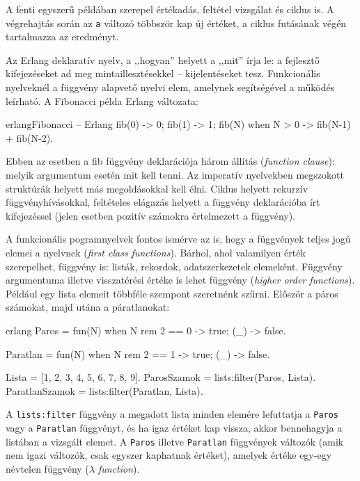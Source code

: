\documentclass[12pt, a4paper, oneside]{book}
\begin{document}
A fenti egyszerű példában szerepel értékadás, feltétel vizsgálat és ciklus is.
A végrehajtás során az \texttt{a} változó többször kap új értéket, a ciklus futásának
végén tartalmazza az eredményt.

Az Erlang deklaratív nyelv, a ,,hogyan'' helyett a ,,mit'' írja le: a fejlesztő
kifejezéseket ad meg mintaillesztésekkel -- kijelentéseket tesz. Funkcionális
nyelveknél a függvény alapvető nyelvi elem, amelynek segítségével a működés
leírható. A Fibonacci példa Erlang változata:

\begin{code}{erlang}{Fibonacci -- Erlang}
fib(0) -> 0; 
fib(1) -> 1; 
fib(N) when N > 0 -> fib(N-1) + fib(N-2).  
\end{code} 

Ebben az esetben a fib függvény deklarációja három állítás
(\emph{function clause}): melyik argumentum esetén mit kell tenni. Az imperatív
nyelvekben megszokott struktúrák helyett más megoldásokkal kell élni. Ciklus
helyett rekurzív függvényhívásokkal, feltételes elágazás helyett a függvény
deklarációba írt kifejezéssel (jelen esetben pozitív számokra értelmezett a
függvény).

A funkcionális pogramnyelvek fontos ismérve az is, hogy a függvények teljes jogú
elemei a nyelvnek (\emph{first class functions}). Bárhol, ahol valamilyen érték
szerepelhet, függvény is: listák, rekordok, adatszerkezetek elemeként. Függvény
argumentuma illetve visszatérési értéke is lehet függvény (\emph{higher order
functions}). Például egy lista elemeit többféle szempont szeretnénk szűrni.
Először a páros számokat, majd utána a páratlanokat:

\begin{code}{erlang}{}
Paros = fun(N) when N rem 2 == 0 -> true;
           (_)                   -> false.

Paratlan = fun(N) when N rem 2 == 1 -> true;
              (_)                   -> false.


Lista = [1, 2, 3, 4, 5, 6, 7, 8, 9].
ParosSzamok = lists:filter(Paros, Lista).
ParatlanSzamok = lists:filter(Paratlan, Lista).
\end{code}

A \texttt{lists:filter} függvény a megadott lista minden elemére lefuttatja a
\texttt{Paros} vagy a \texttt{Paratlan} függvényt, és ha igaz értéket kap
vissza, akkor bennehagyja a listában a vizsgált elemet. A \texttt{Paros}
illetve \texttt{Paratlan} függvények változók (amik nem igazi változók, csak
egyszer kaphatnak értéket), amelyek értéke egy-egy névtelen függvény
(\emph{$\lambda$ function}).
\end{document}
